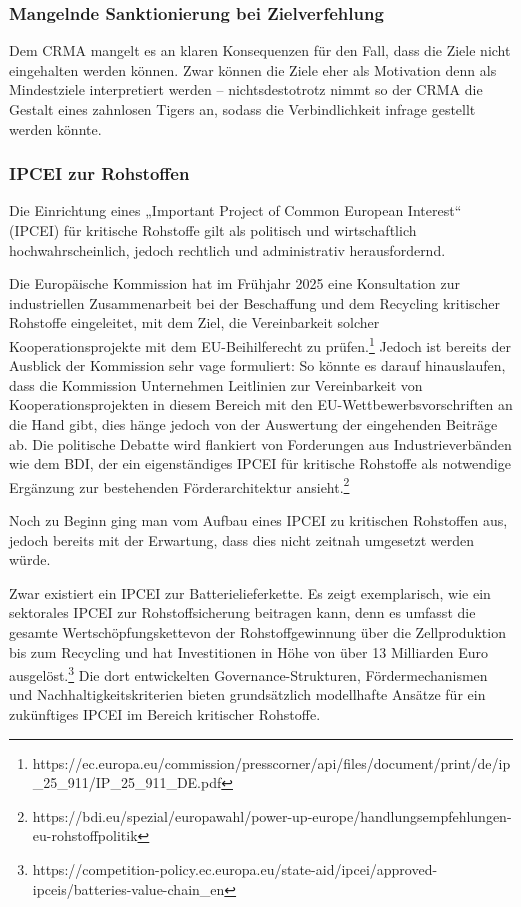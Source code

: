 \documentclass[12pt,a4paper,oneside]{book} %
\begin{document}
\subsubsection{Mangelnde Sanktionierung bei Zielverfehlung}

Dem CRMA mangelt es an klaren Konsequenzen für den Fall, dass die Ziele nicht eingehalten werden können. Zwar können die Ziele eher als Motivation denn als Mindestziele interpretiert werden \autocite{finden, existiert} -- nichtsdestotrotz nimmt so der CRMA die Gestalt eines zahnlosen Tigers an, sodass die Verbindlichkeit infrage gestellt werden könnte.

\subsubsection{IPCEI zur Rohstoffen}
Die Einrichtung eines „Important Project of Common European Interest“ (IPCEI) für kritische Rohstoffe gilt als politisch und wirtschaftlich hochwahrscheinlich, jedoch rechtlich und administrativ herausfordernd.

Die Europäische Kommission hat im Frühjahr 2025 eine Konsultation zur industriellen Zusammenarbeit bei der Beschaffung und dem Recycling kritischer Rohstoffe eingeleitet, mit dem Ziel, die Vereinbarkeit solcher Kooperationsprojekte mit dem EU-Beihilferecht zu prüfen.\footnote{https://ec.europa.eu/commission/presscorner/api/files/document/print/de/ip_25_911/IP_25_911_DE.pdf} Jedoch ist bereits der Ausblick der Kommission sehr vage formuliert: So \glqq könnte es darauf hinauslaufen, dass die Kommission Unternehmen Leitlinien zur Vereinbarkeit von
Kooperationsprojekten in diesem Bereich mit den EU-Wettbewerbsvorschriften an die Hand gibt\grqq, dies hänge jedoch \glqq von der Auswertung der eingehenden Beiträge ab\grqq. Die politische Debatte wird flankiert von Forderungen aus Industrieverbänden wie dem BDI, der ein eigenständiges IPCEI für kritische Rohstoffe als notwendige Ergänzung zur bestehenden Förderarchitektur ansieht.\footnote{https://bdi.eu/spezial/europawahl/power-up-europe/handlungsempfehlungen-eu-rohstoffpolitik}

Noch zu Beginn ging man vom Aufbau eines IPCEI zu kritischen Rohstoffen aus, jedoch bereits mit der Erwartung, dass dies nicht zeitnah umgesetzt werden würde.\autocite{Rohde_PWC}

Zwar existiert ein IPCEI zur Batterielieferkette. Es zeigt exemplarisch, wie ein sektorales IPCEI zur Rohstoffsicherung beitragen kann, denn es umfasst die gesamte Wertschöpfungskettevon der Rohstoffgewinnung über die Zellproduktion bis zum Recycling und hat Investitionen in Höhe von über 13 Milliarden Euro ausgelöst.\footnote{https://competition-policy.ec.europa.eu/state-aid/ipcei/approved-ipceis/batteries-value-chain_en} Die dort entwickelten Governance-Strukturen, Fördermechanismen und Nachhaltigkeitskriterien bieten grundsätzlich modellhafte Ansätze für ein zukünftiges IPCEI im Bereich kritischer Rohstoffe.
\end{document}
